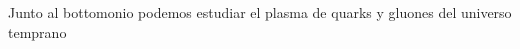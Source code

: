 \documentclass[preview]{standalone}
\begin{document}
\begin{center}
Junto al bottomonio podemos estudiar el plasma de quarks y gluones del universo temprano
\end{center}
\end{document}

